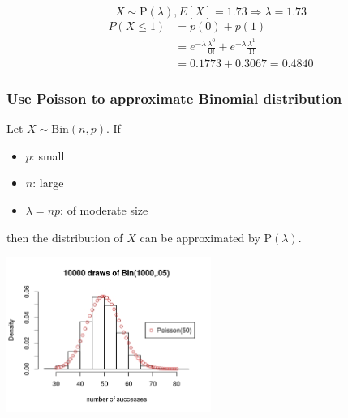 \documentclass[slidestop,compress,mathserif]{beamer}
\begin{document}
\begin{frame}%

{
\pause\vspace{0.5cm}

\[ X \sim \text{P}(\lambda), E[X] = 1.73 \Longrightarrow \lambda = 1.73 \]
\begin{align*}
P(X \leq 1) &= p(0) + p(1)\\
& = e^{-\lambda} \frac{\lambda^0}{0!} +  e^{-\lambda} \frac{\lambda^1}{1!}\\
& = 0.1773 + 0.3067 = 0.4840
\end{align*}
}

\end{frame}

\begin{frame}\frametitle{Use Poisson to approximate Binomial distribution} %

Let $X \sim \text{Bin}(n, p)$. If
\begin{itemize}
\item $p$: small
\item $n$: large
\item $\lambda = np$: of moderate size
\end{itemize}
then the distribution of $X$ can be approximated by $\text{P}(\lambda)$.\\
\pause
\begin{center}
\includegraphics[width = 0.5\textwidth]{figures/poisson_approx_binom}
\end{center}

\end{frame}
\end{document}
